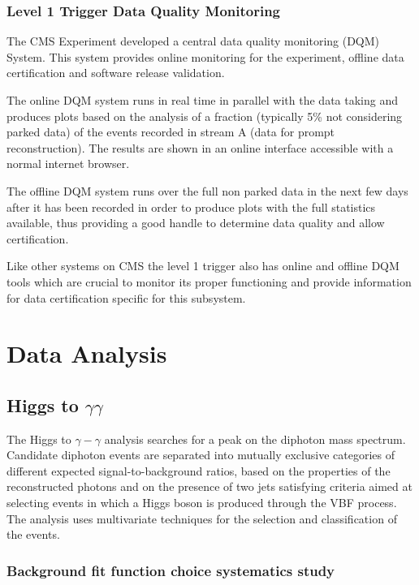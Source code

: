 \documentclass[%
reprint,
amsmath,
amssymb,
aps,
pra,
showkeys
]{revtex4-1}
\begin{document}
\subsubsection{Level 1 Trigger Data Quality Monitoring}

The CMS Experiment developed a central data quality monitoring (DQM) System. This system provides online monitoring 
for the experiment, offline data certification and software release validation.

The online DQM system runs in real time in parallel with the data taking and produces plots based on the analysis of a
fraction (typically 5\% not considering parked data) of the events recorded in stream A (data for prompt reconstruction).
The results are shown in an online interface accessible with a normal internet browser.

The offline DQM system runs over the full non parked data in the next few days after it has been recorded
in order to produce plots with the full statistics available, thus providing a good handle to determine data 
quality and allow certification.

Like other systems on CMS the level 1 trigger also has online and offline DQM tools which are crucial to monitor its 
proper functioning and provide information for data certification specific for this subsystem.

\section{Data Analysis}

\subsection{Higgs to \texorpdfstring{$\gamma\gamma$}{gamma-gamma}}

The Higgs to $\gamma-\gamma$ analysis searches for a peak on the diphoton mass spectrum. Candidate diphoton events are 
separated into mutually exclusive categories of different expected signal-to-background ratios, based on the properties 
of the reconstructed photons and on the presence of two jets satisfying criteria aimed at selecting events in which 
a Higgs boson is produced through the VBF process. The analysis uses multivariate techniques for the selection and 
classification of the events.

\subsubsection{Background fit function choice systematics study}
\end{document}
